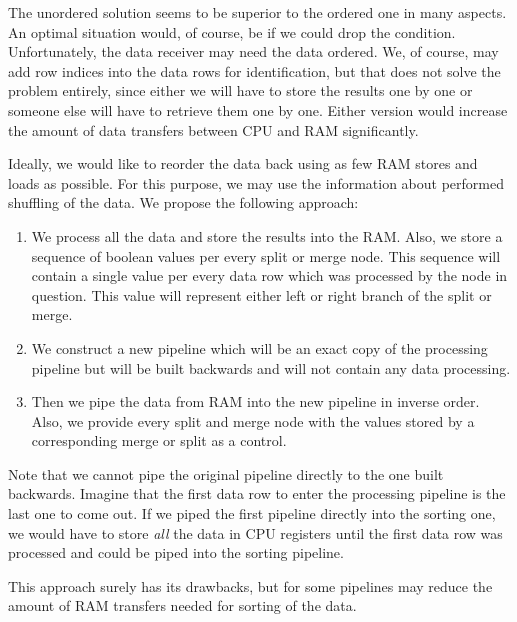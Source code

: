 The unordered solution seems to be superior to the ordered one in many aspects. An optimal situation would, of course, be if we could drop the condition. Unfortunately, the data receiver may need the data ordered.  We, of course, may add row indices into the data rows for identification, but that does not solve the problem entirely, since either we will have to store the results one by one or someone else will have to retrieve them one by one. Either version would increase the amount of data transfers between CPU and RAM significantly. 


Ideally, we would like to reorder the data back using as few RAM stores and loads as possible. For this purpose, we may use the information about performed shuffling of the data. We propose the following approach:
\begin{enumerate}
  \item We process all the data and store the results into the RAM. Also, we store a sequence of boolean values per every split or merge node. This sequence will contain a single value per every data row which was processed by the node in question. This value will represent either left or right branch of the split or merge.
  \item We construct a new pipeline which will be an exact copy of the processing pipeline but will be built backwards and will not contain any data processing.
  \item Then we pipe the data from RAM into the new pipeline in inverse order. Also, we provide every split and merge node with the values stored by a corresponding merge or split as a control.
\end{enumerate}

\begin{rem}
  Note that we cannot pipe the original pipeline directly to the one built backwards. Imagine that the first data row to enter the processing pipeline is the last one to come out. If we piped the first pipeline directly into the sorting one, we would have to store \emph{all} the data in CPU registers until the first data row was processed and could be piped into the sorting pipeline.
\end{rem}

This approach surely has its drawbacks, but for some pipelines may reduce the amount of RAM transfers needed for sorting of the data.
